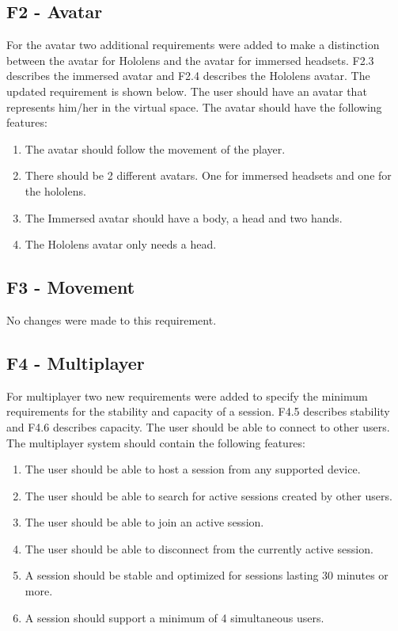         \subsection{F2 - Avatar}
        For the avatar two additional requirements were added to make a distinction between the avatar for Hololens and the avatar for immersed headsets. F2.3 describes the immersed avatar and F2.4 describes the Hololens avatar. The updated requirement is shown below.
        \newline\newline
        The user should have an avatar that represents him/her in the virtual space. The avatar should have the following features:
        \begin{enumerate}
            \item The avatar should follow the movement of the player.
            \item There should be 2 different avatars. One for immersed headsets and one for the hololens.
            \item The Immersed avatar should have a body, a head and two hands.
            \item The Hololens avatar only needs a head.
        \end{enumerate}
        
        \subsection{F3 - Movement}
        No changes were made to this requirement.
        
        \subsection{F4 - Multiplayer}
        For multiplayer two new requirements were added to specify the minimum requirements for the stability and capacity of a session. F4.5 describes stability and F4.6 describes capacity.
        \newline\newline
        The user should be able to connect to other users. The multiplayer system should contain the following features:
        \begin{enumerate}
            \item The user should be able to host a session from any supported device.
            \item The user should be able to search for active sessions created by other users.
            \item The user should be able to join an active session.
            \item The user should be able to disconnect from the currently active session.
            \item A session should be stable and optimized for sessions lasting 30 minutes or more.
            \item A session should support a minimum of 4 simultaneous users.
        \end{enumerate}
        
